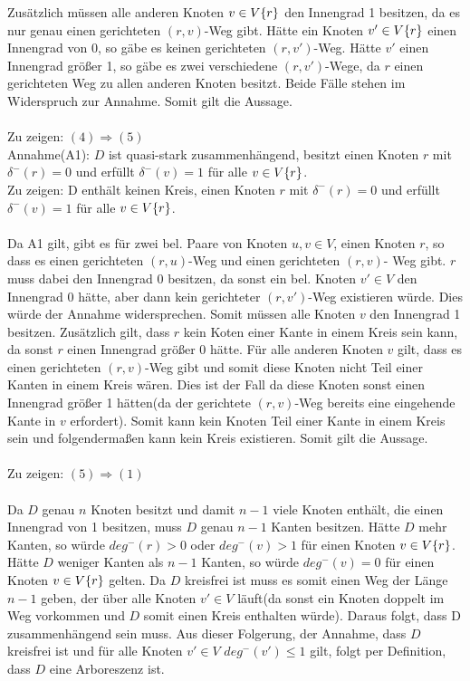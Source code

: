 \documentclass[a4paper,10pt,german]{scrartcl}
\begin{document}
Zusätzlich müssen alle anderen Knoten $v \in V \\ \{r\}$ den Innengrad 1 besitzen, da es nur genau einen gerichteten $(r,v)$-Weg gibt. Hätte ein Knoten $v' \in V \\ \{r\}$ einen Innengrad von 0, so gäbe es keinen gerichteten $(r,v')$-Weg. Hätte $v'$ einen Innengrad größer 1, so gäbe es zwei verschiedene $(r,v')$-Wege, da $r$ einen gerichteten Weg zu allen anderen Knoten besitzt. Beide Fälle stehen im Widerspruch zur Annahme.
Somit gilt die Aussage.\\
\\
Zu zeigen: $(4) \Rightarrow (5)$\\
Annahme(A1): $D$ ist quasi-stark zusammenhängend, besitzt einen Knoten $r$ mit $\delta^-(r) = 0$ und erfüllt $\delta^-(v) = 1$ für alle $v \in V \\ \{r\}$.\\
Zu zeigen: D enthält keinen Kreis, einen Knoten $r$ mit $\delta^-(r) = 0$ und erfüllt $\delta^-(v) = 1$ für alle $v \in V \\ \{r\}$.\\
\\
Da A1 gilt, gibt es für zwei bel. Paare von Knoten $u,v \in V$, einen Knoten $r$, so dass es einen gerichteten $(r,u)$-Weg und einen gerichteten $(r,v)$- Weg gibt. $r$ muss dabei den Innengrad 0 besitzen, da sonst ein bel. Knoten $v' \in V$ den Innengrad 0 hätte, aber dann kein gerichteter $(r,v')$-Weg existieren würde. Dies würde der Annahme widersprechen. Somit müssen alle Knoten $v$ den Innengrad 1 besitzen. 
Zusätzlich gilt, dass $r$ kein Koten einer Kante in einem Kreis sein kann, da sonst $r$ einen Innengrad größer 0 hätte. Für alle anderen Knoten $v$ gilt, dass es einen gerichteten $(r,v)$-Weg gibt und somit diese Knoten nicht Teil einer Kanten in einem Kreis wären. Dies ist der Fall da diese Knoten sonst einen Innengrad größer 1 hätten(da der gerichtete $(r,v)$-Weg bereits eine eingehende Kante in $v$ erfordert). Somit kann kein Knoten Teil einer Kante in einem Kreis sein und folgendermaßen kann kein Kreis existieren. Somit gilt die Aussage.\\ 
\\
Zu zeigen: $(5) \Rightarrow (1)$\\
\\
Da $D$ genau $n$ Knoten besitzt und damit $n - 1$ viele Knoten enthält, die einen Innengrad von 1 besitzen, muss $D$ genau $n - 1$ Kanten besitzen. Hätte $D$ mehr Kanten, so würde $deg^-(r) > 0$ oder $deg^-(v) > 1$ für einen Knoten $v \in V \\ \{r\}$. Hätte $D$ weniger Kanten als $n - 1$ Kanten, so würde $deg^-(v)=0$ für einen Knoten $v \in V \\ \{r\}$ gelten. Da $D$ kreisfrei ist muss es somit einen Weg der Länge $n - 1$ geben, der über alle Knoten $v' \in V$ läuft(da sonst ein Knoten doppelt im Weg vorkommen und $D$ somit einen Kreis enthalten würde). Daraus folgt, dass D zusammenhängend sein muss. Aus dieser Folgerung, der Annahme, dass $D$ kreisfrei ist und für alle Knoten $v' \in V$ $deg^-(v') \le 1$ gilt, folgt per Definition, dass $D$ eine Arboreszenz ist. 
\end{document}
